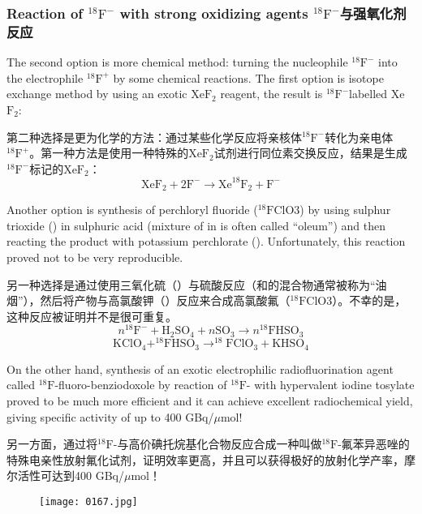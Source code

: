 \documentclass[dvipsnames, svgnames,a4paper,11pt]{article}
\begin{document}
\subsubsection{Reaction of ${}^\mathrm{18}\mathrm{F^-}$ with strong oxidizing agents ${}^\mathrm{18}\mathrm{F^-}$与强氧化剂反应}
The second option is more chemical method: turning the nucleophile ${}^\mathrm{18}\mathrm{F^-}$ into the
electrophile {${}^\mathrm{18}\mathrm{F}^+$} by some chemical reactions. The first option is isotope exchange
method by using an exotic Xe$\mathrm{F}_2$ reagent, the result is ${}^\mathrm{18}\mathrm{F^-}$labelled Xe$\mathrm{F}_2$:

第二种选择是更为化学的方法：通过某些化学反应将亲核体${}^\mathrm{18}\mathrm{F^-}$转化为亲电体{${}^\mathrm{18}\mathrm{F}^+$}。第一种方法是使用一种特殊的Xe$\mathrm{F}_2$试剂进行同位素交换反应，结果是生成${}^\mathrm{18}\mathrm{F^-}$标记的Xe$\mathrm{F}_2$：
\[
\text{XeF}_2 + 2\text{F}^- \rightarrow \text{Xe}^{18}\text{F}_2 + \text{F}^-
\]

Another option is synthesis of perchloryl fluoride (${}^\mathrm{18}\mathrm{F}$ClO3) by using sulphur trioxide
() in sulphuric acid (mixture of  in  is often called “oleum”) and then
reacting the product with potassium perchlorate (). Unfortunately, this reaction
proved not to be very reproducible. 

另一种选择是通过使用三氧化硫（）与硫酸反应（和的混合物通常被称为“油烟”），然后将产物与高氯酸钾（）反应来合成高氯酸氟（${}^\mathrm{18}\mathrm{F}$ClO3）。不幸的是，这种反应被证明并不是很可重复。
\[
n^{18}\text{F}^- + \text{H}_2\text{SO}_4 + n\text{SO}_3 \rightarrow n^{18}\text{FHSO}_3
\]
\[
\text{KClO}_4 + ^{18}\text{FHSO}_3 \rightarrow ^{18}\text{FClO}_3 + \text{KHSO}_4
\]

On the other hand, synthesis of an exotic electrophilic radiofluorination agent called
${}^\mathrm{18}\mathrm{F}$-fluoro-benziodoxole by reaction of ${}^\mathrm{18}\mathrm{F}$- with hypervalent iodine tosylate proved to
be much more efficient and it can achieve excellent radiochemical yield, giving
specific activity of up to 400 GBq/$\mu$mol!

另一方面，通过将${}^\mathrm{18}\mathrm{F}$-与高价碘托烷基化合物反应合成一种叫做${}^\mathrm{18}\mathrm{F}$-氟苯异恶唑的特殊电亲性放射氟化试剂，证明效率更高，并且可以获得极好的放射化学产率，摩尔活性可达到400 GBq/$\mu$mol！

\begin{figure}[h]
	\centering
    \texttt{[image: 0167.jpg]}    
     \label{fig185}
\end{figure}
\end{document}
